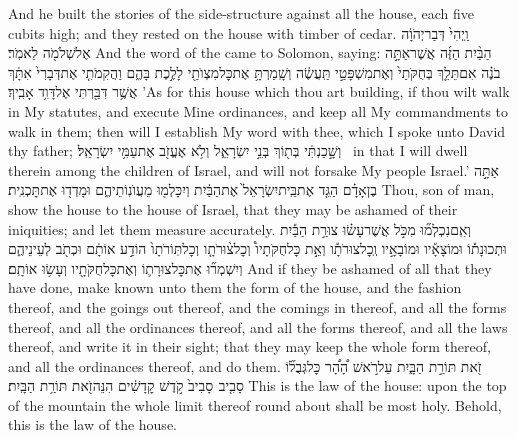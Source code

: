 {And he built the stories of the side-structure against all the house, each five cubits high; and they rested on the house with timber of cedar.}
{וַֽיְהִי֙ דְּבַר\maqqaf יְהֹוָ֔ה אֶל\maqqaf שְׁלֹמֹ֖ה לֵאמֹֽר׃}
{And the word of the \lord\space came to Solomon, saying:}
{הַבַּ֨יִת הַזֶּ֜ה אֲשֶׁר\maqqaf אַתָּ֣ה בֹנֶ֗ה אִם\maqqaf תֵּלֵ֤ךְ בְּחֻקֹּתַי֙ וְאֶת\maqqaf מִשְׁפָּטַ֣י תַּֽעֲשֶׂ֔ה וְשָֽׁמַרְתָּ֥ אֶת\maqqaf כׇּל\maqqaf מִצְוֺתַ֖י לָלֶ֣כֶת בָּהֶ֑ם וַהֲקִמֹתִ֤י אֶת\maqqaf דְּבָרִי֙ אִתָּ֔ךְ אֲשֶׁ֥ר דִּבַּ֖רְתִּי אֶל\maqqaf דָּוִ֥ד אָבִֽיךָ׃}
{’As for this house which thou art building, if thou wilt walk in My statutes, and execute Mine ordinances, and keep all My commandments to walk in them; then will I establish My word with thee, which I spoke unto David thy father;}
{וְשָׁ֣כַנְתִּ֔י בְּת֖וֹךְ בְּנֵ֣י יִשְׂרָאֵ֑ל וְלֹ֥א אֶעֱזֹ֖ב אֶת\maqqaf עַמִּ֥י יִשְׂרָאֵֽל׃ \petucha }
{in that I will dwell therein among the children of Israel, and will not forsake My people Israel.’}
\newperek
{}
\label{haft_20}
\setcounter{chap}{43}
\setcounter{verse}{10}
{אַתָּ֣ה בֶן\maqqaf אָדָ֗ם הַגֵּ֤ד אֶת\maqqaf בֵּֽית\maqqaf יִשְׂרָאֵל֙ אֶת\maqqaf הַבַּ֔יִת וְיִכָּלְמ֖וּ מֵעֲוֺנֽוֹתֵיהֶ֑ם וּמָדְד֖וּ אֶת\maqqaf תׇּכְנִֽית׃}
{Thou, son of man, show the house to the house of Israel, that they may be ashamed of their iniquities; and let them measure accurately.}
{וְאִֽם\maqqaf נִכְלְמ֞וּ מִכֹּ֣ל אֲשֶׁר\maqqaf עָשׂ֗וּ צוּרַ֣ת הַבַּ֡יִת וּתְכוּנָת֡וֹ וּמוֹצָאָ֡יו וּמוֹבָאָ֣יו וְֽכׇל\maqqaf צוּרֹתָ֡ו וְאֵ֣ת כׇּל\maqqaf חֻקֹּתָיו֩ וְכׇל\maqqaf צ֨וּרֹתָ֤ו וְכׇל\maqqaf תּֽוֹרֹתָו֙ הוֹדַ֣ע אוֹתָ֔ם וּכְתֹ֖ב לְעֵינֵיהֶ֑ם וְיִשְׁמְר֞וּ אֶת\maqqaf כׇּל\maqqaf צוּרָת֛וֹ וְאֶת\maqqaf כׇּל\maqqaf חֻקֹּתָ֖יו וְעָשׂ֥וּ אוֹתָֽם׃}
{And if they be ashamed of all that they have done, make known unto them the form of the house, and the fashion thereof, and the goings out thereof, and the comings in thereof, and all the forms thereof, and all the ordinances thereof, and all the forms thereof, and all the laws thereof, and write it in their sight; that they may keep the whole form thereof, and all the ordinances thereof, and do them.}
{זֹ֖את תּוֹרַ֣ת הַבָּ֑יִת עַל\maqqaf רֹ֣אשׁ הָ֠הָ֠ר כׇּל\maqqaf גְּבֻל֞וֹ סָבִ֤יב \pasek  סָבִיב֙ קֹ֣דֶשׁ קׇדָשִׁ֔ים הִנֵּה\maqqaf זֹ֖את תּוֹרַ֥ת הַבָּֽיִת׃}
{This is the law of the house: upon the top of the mountain the whole limit thereof round about shall be most holy. Behold, this is the law of the house.}
